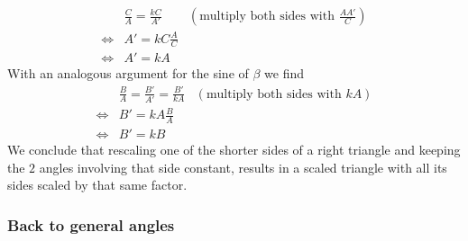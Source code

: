 \begin{eqnarray*}
& \frac{C}{A} = \frac{kC}{A'}  & \left( \text{multiply both sides with } \frac{A A'}{C} \right) \\
\Leftrightarrow & A'= kC \frac{A}{C}  & \\
\Leftrightarrow & A'= kA & 
\end{eqnarray*}
\noindent With an analogous argument for the sine of $\beta$ we find
\begin{eqnarray*}
& \frac{B}{A} = \frac{B'}{A'} = \frac{B'}{kA} & \left( \text{multiply both sides with } kA \right)  \\
\Leftrightarrow & B'= kA\frac{B}{A} & \\
\Leftrightarrow & B'= kB &
\end{eqnarray*}
\noindent We conclude that rescaling one of the shorter sides of a right triangle and keeping the $2$ angles involving that side constant, results in a scaled triangle with all its sides scaled by that same factor.

\subsubsection{Back to general angles} 

